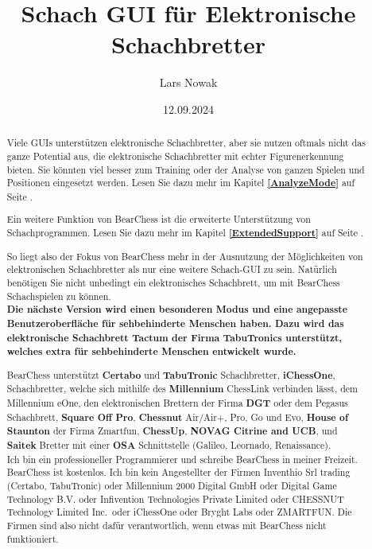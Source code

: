 \documentclass[11pt,a4paper]{article}
\title{Schach GUI für Elektronische Schachbretter}
\author{Lars Nowak}
\date{12.09.2024}
\begin{document}
	\maketitle
	
	\begin{abstract}
		
		Viele GUIs unterstützen elektronische Schachbretter, aber sie nutzen oftmals nicht das ganze Potential aus, die
		elektronische Schachbretter mit echter Figurenerkennung bieten. Sie könnten viel besser zum Training oder der Analyse von ganzen Spielen und Positionen eingesetzt werden. Lesen Sie dazu mehr im Kapitel \textbf{\ref{AnalyzeMode}  } auf Seite \pageref{AnalyzeMode}.
		
		Ein weitere Funktion von BearChess ist die erweiterte Unterstützung von Schachprogrammen. Lesen Sie dazu mehr im Kapitel \textbf{\ref{ExtendedSupport}  } auf Seite \pageref{ExtendedSupport}.
		
		So liegt also der Fokus von BearChess mehr in der Ausnutzung der Möglichkeiten von elektronischen Schachbretter als nur eine weitere Schach-GUI zu sein. Natürlich benötigen Sie nicht unbedingt ein elektronisches Schachbrett, um mit BearChess Schachspielen zu können.\\
	
	    \textbf{Die nächste Version wird einen besonderen Modus und eine angepasste Benutzeroberfläche für sehbehinderte Menschen haben. Dazu wird das elektronische Schachbrett Tactum der Firma TabuTronics unterstützt, welches extra für sehbehinderte Menschen entwickelt wurde.\\}
		
		BearChess unterstützt \textbf{Certabo} und \textbf{TabuTronic} Schachbretter, \textbf{iChessOne}, Schachbretter, welche sich mithilfe des \textbf{Millennium} ChessLink verbinden lässt, dem Millennium eOne, den elektronischen Brettern der Firma \textbf{DGT} oder dem Pegasus Schachbrett, \textbf{Square Off Pro}, \textbf{Chessnut} Air/Air+, Pro, Go und Evo,
		\textbf{House of Staunton} der Firma Zmartfun, \textbf{ChessUp}, \textbf{NOVAG Citrine and UCB}, und \textbf{Saitek} Bretter mit einer \textbf{OSA} Schnittstelle (Galileo, Leornado, Renaissance).\\
		
		Ich bin ein professioneller Programmierer und schreibe BearChess in meiner Freizeit. BearChess ist kostenlos. Ich bin kein Angestellter der Firmen Inventhio Srl trading (Certabo, TabuTronic) oder Millennium 2000 Digital GmbH oder Digital Game Technology B.V. oder Infivention Technologies Private Limited oder CHESSNUT Technology Limited Inc.\ oder iChessOne oder Bryght Labs oder ZMARTFUN. Die Firmen sind also nicht dafür verantwortlich, wenn etwas mit BearChess nicht funktioniert.\\
		

\end{abstract}
\end{document}

